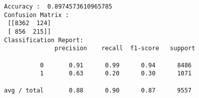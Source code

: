 \documentclass[11pt]{article}
\begin{document}
    \begin{Verbatim}[commandchars=\\\{\}]
Accuracy :  0.8974573610965785
Confusion Matrix : 
 [[8362  124]
 [ 856  215]]
Classification Report: 
              precision    recall  f1-score   support

          0       0.91      0.99      0.94      8486
          1       0.63      0.20      0.30      1071

avg / total       0.88      0.90      0.87      9557


    \end{Verbatim}


    
    
    
    
\end{document}
